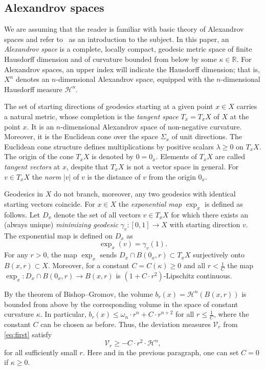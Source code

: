 \documentclass[12pt,leqno,intlimits]{amsart}
\numberwithin{equation}{section}
\theoremstyle{definition}
\theoremstyle{remark}
\newcommand{\R}{\mathbb{R}}
\def\:{\colon}
\begin{document}
\subsection{Alexandrov spaces} \label{subsec:Alex}
We are assuming that the reader is familiar with basic theory of Alexandrov spaces and refer to~\cite{BGP} as an introduction to the subject.
In this paper, an \emph{Alexandrov space} is a complete, locally compact, geodesic metric space of finite Hausdorff dimension and of curvature bounded from below by some $\kappa \in \R$.
For Alexandrov spaces, an upper index will indicate the Hausdorff dimension; that is, $X^n$ denotes an $n$-dimensional Alexandrov space, equipped with the $n$-dimensional Hausdorff measure $\mathcal H^n$.

The set of starting directions of geodesics starting at a given point $x\in X$ carries a natural metric, whose completion is the \emph{tangent space} $T_x=T_xX$
of $X$ at the point $x$. It is  an $n$-dimensional Alexandrov space of non-negative curvature. Moreover, it is the Euclidean cone
over the space $\Sigma _x$ of unit directions. The Euclidean cone structure defines multiplications by positive scalars $\lambda \geq 0$ on $T_xX$. The origin
of the cone $T_xX$ is denoted by $0=0_x$.
Elements of $T_xX$ are called \emph{tangent vectors} at $x$, despite that $T_xX$ is not a vector space in general.
For $v\in T_xX$ the \emph{norm} $|v|$ of $v$ is the distance of $v$ from the origin $0_x$.

Geodesics in $X$ do not branch,  moreover, any two geodesics with  identical starting vectors coincide.
For $x\in X$ the \emph{exponential map} $\exp_x$ is defined as follows.
Let $D_x$ denote the set of all vectors $v\in T_xX$ for which there exists an (always unique) \emph{minimizing geodesic} $\gamma_v\:[0,1] \to X$ with starting direction $v$. The exponential map is defined on $D_x$ as
$$\exp _x (v)= \gamma _v(1).$$
For any $r>0$, the map $\exp_x$ sends $D_x\cap B (0_x,r)\subset T_xX$ surjectively onto $B(x,r)\subset X$.
Moreover, for a constant $C=C(\kappa)\geq 0$ and all $r< \frac 1 C$ the map $\exp_x \:D_x \cap B(0_x,r) \to B(x,r)$ is $(1+ C \cdot r^2)$-Lipschitz continuous.

By the theorem of Bishop--Gromov, the volume $b_r (x)=\mathcal H^n (B(x,r))$ is bounded from above by the corresponding volume in the
space of constant curvature $\kappa$. In particular, $b_r (x) \leq \omega _n \cdot r^n + C \cdot r^{n+2}$ for all $r\leq \frac 1 C$, where
the constant $C$ can be chosen as before. Thus, the deviation measures $\mathcal{V}_r $ from \eqref{eq:first} satisfy
$$\mathcal{V}_r \geq -C\cdot r^2\cdot  \mathcal H^n,$$
for all sufficiently small $r$.
Here and in the previous paragraph, one can set $C=0$ if $\kappa \geq 0$.
\end{document}
